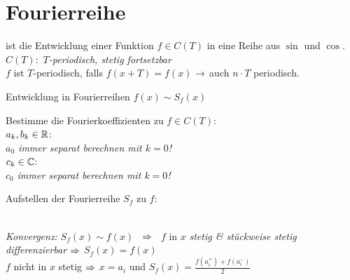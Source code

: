 \documentclass[german,color,6pt]{latex4ei/latex4ei_fs}
\begin{document}
\section{Fourierreihe}
\begin{sectionbox}
ist die Entwicklung einer Funktion $f\in C(T)$ in eine Reihe aus $\sin$ und $\cos$.\\
$C(T):$ \emph{$T$-periodisch, stetig fortsetzbar}\\
$f$ ist $T$-periodisch, falls $f(x+T) = f(x)$ $\rightarrow$ auch $n \cdot T$ periodisch.

	\begin{cookbox}{Entwicklung in Fourierreihen $f(x) \sim S_f(x)$}
		\item Bestimme die Fourierkoeffizienten zu $f \in C(T)$:\\
		$a_k,b_k \in \operatorname{\mathbb R}$: \quad {}\\
		\emph{$a_0$ immer separat berechnen mit $k = 0$!}\\
		$c_k \in \mathbb C$: \quad {} \\
		\emph{$c_0$ immer separat berechnen mit $k = 0$!}\\
		
		\item Aufstellen der Fourierreihe $S_f$ zu $f$:  \\
		 \\
	\end{cookbox}
	
	\emph{Konvergenz:} $S_f(x) \sim f(x)$ \ $\Rightarrow$ \ $f$ in $x$ \emph{stetig \& stückweise stetig differenzierbar} $\Rightarrow$ $S_f(x) = f(x)$\\
	$f$ nicht in $x$ stetig $\Rightarrow$ $x = a_i$ und $S_f(x) = \frac{f(a_i^+) + f(a_i^-)}{2}$\\
\end{sectionbox}
\end{document}

